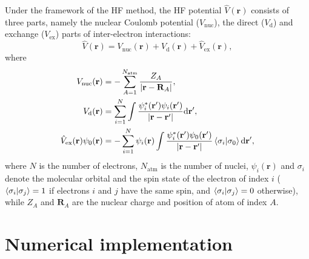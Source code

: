 \documentclass[preprint,12pt]{elsarticle} %
\newcommand{\bn}[1]{\mathbf{#1}}    %
\renewcommand{\rm}[1]{\mathrm{#1}}    %
\newcommand{\dd}{\mathrm{d}}    %
\newcommand{\abs}[1]{\lvert #1 \rvert}  %
\begin{document}
Under the framework of the HF method, the HF potential $\hat{V}(\bn{r})$ consists of three parts, namely the nuclear Coulomb potential ($V_{\rm{nuc}}$), the direct ($V_{\rm{d}}$) and exchange ($V_{\rm{ex}}$) parts of inter-electron interactions:
\begin{equation}
    \hat{V}(\bn{r}) = V_{\rm{nuc}}(\bn{r}) + V_{\rm{d}}(\bn{r}) + \hat{V}_{\rm{ex}}(\bn{r}),
\end{equation}
where
\begin{align}
    V_{\rm{nuc}}(\bn{r}) &= -\sum_{A=1}^{N_{\rm{atm}}} \frac{Z_A}{\left|\bn{r}-\bn{R}_A\right|}, \label{eq:Vnuc} \\
    V_{\rm{d}}(\bn{r}) &= \sum_{i=1}^N \int \frac{\psi_i^*(\bn{r}') \psi_i(\bn{r}')}{\abs{\bn{r}-\bn{r}'}} \dd \bn{r}', \label{eq:Vd} \\
    \hat{V}_{\rm{ex}}(\bn{r}) \psi_0(\bn{r}) &= -\sum_{i=1}^N \psi_i(\bn{r}) \int \frac{\psi_i^*(\bn{r}') \psi_0(\bn{r}')}{\abs{\bn{r}-\bn{r}'}} \braket{\sigma_i | \sigma_0} \dd \bn{r}', \label{eq:VexPsi0}
\end{align}
where $N$ is the number of electrons, $N_{\rm{atm}}$ is the number of nuclei, $\psi_i(\bn{r})$ and $\sigma_i$ denote the molecular orbital and the spin state of the electron of index $i$ ($\braket{\sigma_i | \sigma_j}=1$ if electrons $i$ and $j$ have the same spin, and $\braket{\sigma_i | \sigma_j}=0$ otherwise), while $Z_A$ and $\bn{R}_A$ are the nuclear charge and position of atom of index $A$.


\section{Numerical implementation}
\label{sec:numerical}
\end{document}
